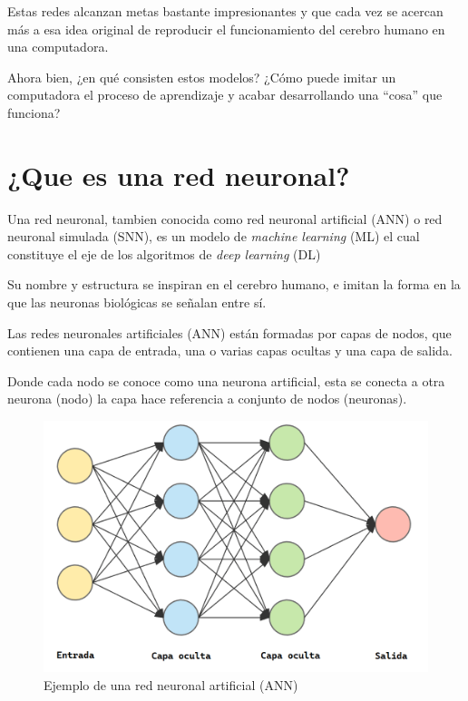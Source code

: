 \documentclass[runningheads]{llncs} %
\begin{document}
Estas redes alcanzan metas bastante impresionantes y que cada vez se acercan 
más a esa idea original de reproducir el funcionamiento del cerebro humano 
en una computadora. 

Ahora bien, ¿en qué consisten estos modelos? ¿Cómo puede imitar un computadora 
el proceso de aprendizaje y acabar desarrollando una
\textquotedblleft{cosa}\textquotedblright{} que funciona? \cite{int2}
\section{¿Que es una red neuronal?}
Una red neuronal, tambien conocida como red neuronal artificial (ANN)
o red neuronal simulada (SNN), es un modelo de \textit{machine learning} (ML)
el cual constituye el eje de los algoritmos de \textit{deep learning} (DL) 

Su nombre y estructura se inspiran en el cerebro humano, 
e imitan la forma en la que las neuronas biológicas se señalan entre sí.

Las redes neuronales artificiales (ANN) están formadas por capas de nodos, 
que contienen una capa de entrada, una o varias capas ocultas y una capa de salida.
\cite{def-ibm1}

Donde cada nodo se conoce como una neurona artificial, esta se conecta a 
otra neurona (nodo) la capa hace referencia a conjunto de nodos (neuronas).

\begin{figure}
    \centering
    \includegraphics[scale=0.4]{red_neuronal_artificial.png}
    \caption{Ejemplo de una red neuronal artificial (ANN) \cite{int1}}
    \label{fig:red_neuronal_artificial}
\end{figure}
\end{document}
